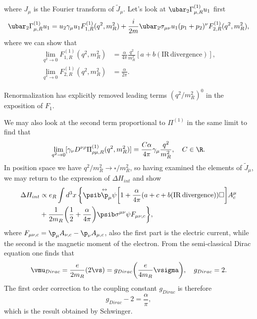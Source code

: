 where $J_\mu$ is the Fourier transform of $\tilde{J}_\mu$. Let's look at $\ubar_2\Gamma^{(1)}_{\mu,R}u_1$ first
\begin{equation}
    \ubar_2\Gamma^{(1)}_{\mu,R}u_1 = u_2\gamma_\mu u_1 F^{(1)}_{1,R}(q^2,m_R^2) + \frac{i}{2m}\ubar_2\sigma_{\mu\nu}u_1(p_1 + p_2)^\nu F_{2,R}^{(1)}(q^2,m_R^2),
\end{equation}
where we can show that 
\begin{align}
    \lim_{q^2\to 0}F_{1,R}^{(1)}(q^2,m_R^2) &= \frac{\alpha}{4\pi}\frac{q^2}{m_R^2}[a + b(\mathrm{IR\,divergence})], \\
    \lim_{q^2\to 0}F_{2,R}^{(1)}(q^2,m_R^2) &= \frac{\alpha}{2\pi}.
\end{align}
\begin{obs}
    Renormalization has explicitly removed leading terms $(q^2/m_R^2)^0$ in the exposition of $F_1$.
\end{obs}
We may also look at the second term proportional to $\Pi^{(1)}$ in the same limit to find that
\begin{equation}
    \lim_{q^2\to 0}[\gamma_\nu D^{\nu\rho}\Pi^{(1)}_{\rho\mu,R}(q^2,m_R^2)] = \frac{C\alpha}{4\pi}\gamma_\mu\frac{q^2}{m_R^2},\quad C \in \R.
\end{equation}
In position space we have $q^2/m_R^2 \to \square/m_R^2$, so having examined the elements of $\tilde{J}_\mu$, we may return to the expression of $\Delta H_{int}$ and show 
\begin{equation}
    \begin{split}
        \Delta H_{int} &\propto e_R\int d^3x\,\bigg\{\psib\overset{\leftrightarrow}{\p}_\mu\psi\bigg[1 + \frac{\alpha}{4\pi}(a + c + b(\mathrm{IR\,divergence}))\square\bigg]A^\mu_c \\
        &+ \frac{1}{2m_R}\bigg(\frac{1}{2} + \frac{\alpha}{4\pi}\bigg)\psib\sigma^{\mu\nu}\psi F_{\mu\nu,c}\bigg\},
    \end{split}
\end{equation}
where $F_{\mu\nu,c} = \p_\mu A_{\nu,c} - \p_\nu A_{\mu,c}$, also the first part is the electric current, while the second is the magnetic moment of the electron. From the semi-classical Dirac equation one finds that 
\begin{equation}
    \vmu_{Dirac} = \frac{e}{2m_R}(2\vs) = g_{Dirac}\bigg(\frac{e}{4m_R}\vsigma\bigg),\quad g_{Dirac} = 2.
\end{equation}
The first order correction to the coupling constant $g_{Dirac}$ is therefore
\begin{equation}
    g_{Dirac} - 2 = \frac{\alpha}{\pi},
\end{equation}
which is the result obtained by Schwinger. 


